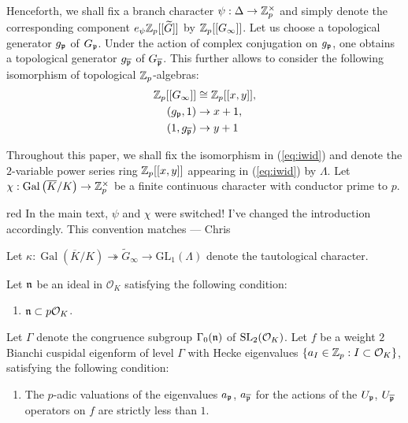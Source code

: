 \documentclass[a4paper,11pt]{article}
\newcommand{\CWnote}[1]{
 \begin{color}{red}
 \marginpar{$\spadesuit$} #1
  --- Chris
 \end{color}
}
\newcommand{\CWnote}[1]{

}
\newcommand{\cO}{\mathcal{O}}
\DeclareMathOperator{\Gal}{Gal}
\numberwithin{equation}{section}
\newcommand{\Galois}[2]{\Gal({#1}/{#2})}
\newcommand{\GL}{\mathrm{GL}}
\begin{document}
Henceforth, we shall fix a branch character $\psi:\Delta \rightarrow \mathbb{Z}_p^\times$ and simply denote the corresponding component $e_\psi\mathbb{Z}_p[[\widetilde{G}]]$ by $\mathbb{Z}_p[[G_\infty]]$. Let us choose a topological generator $g_{\mathfrak{p}}$  of $G_{\mathfrak{p}}$. Under the action of complex conjugation on $g_{\mathfrak{p}}$, one obtains a topological generator $g_{\overline{\mathfrak{p}}}$ of  $G_{\overline{\mathfrak{p}}}$. This further allows to consider the following isomorphism of topological $\mathbb{Z}_p$-algebras:
\begin{align} \label{eq:iwid}
\mathbb{Z}_p[[G_\infty]] &\cong \mathbb{Z}_p[[x,y]], \\
(g_{\mathfrak{p}},1) &\rightarrow x+1, \notag \\
(1,g_{\overline{\mathfrak{p}}}) &\rightarrow y+1 \notag
\end{align}


Throughout this paper, we shall fix the isomorphism in (\ref{eq:iwid})  and denote the $2$-variable power series ring $\mathbb{Z}_p[[x,y]]$ appearing in (\ref{eq:iwid}) by $\Lambda$. Let $\chi: \Gal\left({\overline{K}}/{K}\right) \rightarrow \Z_p^\times$ be a finite continuous character with conductor prime to $p$. \CWnote{In the main text, $\psi$ and $\chi$ were switched! I've changed the introduction accordingly. This convention matches \cite{PS11}} Let $\kappa: \Galois{\overline{K}}{K} \twoheadrightarrow \widetilde{G}_\infty \rightarrow \GL_1(\Lambda)$ denote the tautological character.

Let $\mathfrak{n}$ be an ideal in $\cO_K$ satisfying the following condition:
\begin{enumerate}[style=sameline, style=sameline, align=left,label=(\textsc{$p$-stab}) --- , ref=(\textsc{$p$-stab})]
\item\label{hyp:pstab} $\n \subset p\cO_K$.
\end{enumerate}
Let $\Gamma$ denote the congruence subgroup $\Gamma_0(\mathfrak{n})$ of $\mathrm{SL}_2(\mathcal{O}_K)$. Let $f$ be a weight $2$ Bianchi cuspidal eigenform of level $\Gamma$ with Hecke eigenvalues $\{a_I \in \mathbb{Z}_p: I\subset \mathcal{O}_K\}$, satisfying the following condition:
\begin{enumerate}[style=sameline, style=sameline, align=left,label=(\textsc{Small slope}) --- , ref=(\textsc{Small slope})]
\item\label{hyp:ss} The $p$-adic valuations of the eigenvalues $a_{\mathfrak{p}}$, $a_{\overline{\mathfrak{p}}}$ for the actions of the $U_{\mathfrak{p}}$, $U_{\overline{\mathfrak{p}}}$ operators on $f$ are strictly less than $1$.
\end{enumerate}
\end{document}
